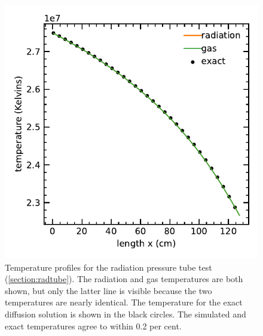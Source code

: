 \documentclass[fleqn,usenatbib]{mnras}
\begin{document}
\begin{figure}
    \includegraphics[width=\columnwidth]{radiation_pressure_tube.pdf}
    \caption{Temperature profiles for the radiation pressure tube test (\autoref{section:radtube}). The radiation and gas temperatures are both shown, but only the latter line is visible because the two temperatures are nearly identical. The temperature for the exact diffusion solution is shown in the black circles. The simulated and exact temperatures agree to within 0.2 per cent.}
    \label{fig:radiation_pressure_tube}
\end{figure}
\end{document}
